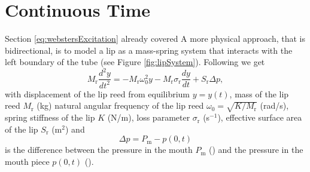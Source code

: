 \section{Continuous Time}
Section \ref{eq:webstersExcitation} already covered  A more physical approach, that is bidirectional, is to model a lip as a mass-spring system that interacts with the left boundary of the tube (see Figure \ref{fig:lipSystem}). Following \cite{Harrison2018} we get
\begin{equation}
    M_\text{r}\frac{d^2y}{dt^2} = -M_\text{r} \omega_0^2 y - M_\text{r} \sigma_\text{r} \frac{dy}{dt} + S_\text{r}\Delta p,
\end{equation}
with displacement of the lip reed from equilibrium $y = y(t)$, mass of the lip reed $M_\text{r}$ (kg) natural angular frequency of the lip reed $\omega_0 = \sqrt{K/M_\text{r}}$ (rad/s), spring stiffness of the lip $K$ (N/m), loss parameter $\sigma_\text{r}$ (s$^{-1}$), effective surface area of the lip $S_\text{r}$ (m$^2$) and 
\begin{equation}
    \Delta p = P_\text{m} - p(0,t)
\end{equation}
is the difference between the pressure in the mouth $P_\text{m}$ (\SWcomment[kPa]) and the pressure in the mouth piece $p(0,t)$ (\SWcomment[kPa]). 
